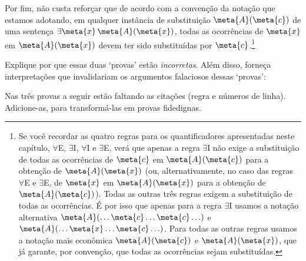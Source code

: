 Por fim, não custa reforçar que de acordo com a convenção da notação que estamos adotando, em qualquer instância de substituição $\meta{A}(\meta{c})$ de uma sentença $\exists \meta{x}\,\meta{A}(\meta{x})$, todas as ocorrências de $\meta{x}$ em $\meta{A}(\meta{x})$ devem ter sido substituídas por $\meta{c}$.\footnote{
	Se você recordar as quatro regras para os quantificadores apresentadas neste capítulo, $\forall$E, $\exists$I, $\forall$I e $\exists$E, verá que apenas a regra $\exists$I não exige a substituição de todas as ocorrências de $\meta{c}$ em $\meta{A}(\meta{c})$ para a obtenção de $\meta{A}(\meta{x})$ (ou, alternativamente, no caso das regras $\forall$E e $\exists$E, de $\meta{x}$ em $\meta{A}(\meta{x})$ para a obtenção de $\meta{A}(\meta{c})$). Todas as outras três regras exigem a substituição de todas as ocorrências. É por isso que apenas para a regra $\exists$I usamos a notação alternativa $\meta{A}(\ldots\meta{c}\ldots\meta{c}\ldots)$ e $\meta{A}(\ldots \meta{x} \ldots \meta{c}\ldots)$. Para todas as outras regras usamos a notação mais econômica $\meta{A}(\meta{c})$ e $\meta{A}(\meta{x})$, que já garante, por convenção, que todas as ocorrências sejam substituídas.}


\practiceproblems
\problempart
Explique por que essas duas `provas' estão \emph{incorretas}. Além disso, forneça interpretações que invalidariam os argumentos falaciosos dessas `provas':
	\begin{fitchproof}
		\open
			\open
			\close
		\close
	\end{fitchproof}
	\begin{fitchproof}
		\hypo{AE}{\forall x\, \exists y\, \atom{R}{x,y}}
		\Ae{AE}
		\open
			\hypo{ass}{{\scriptsize \boxed{a}} \ \ \atom{R}{a,a}}
			\Ei{ass}
		\close
		\Ee{E, ass-Ex}
	\end{fitchproof}

\problempart 
\label{pr.justifyFOLproof}
Nas três provas a seguir estão faltando as citações (regra e
números de linha). Adicione-as, para transformá-las em provas fidedignas.

